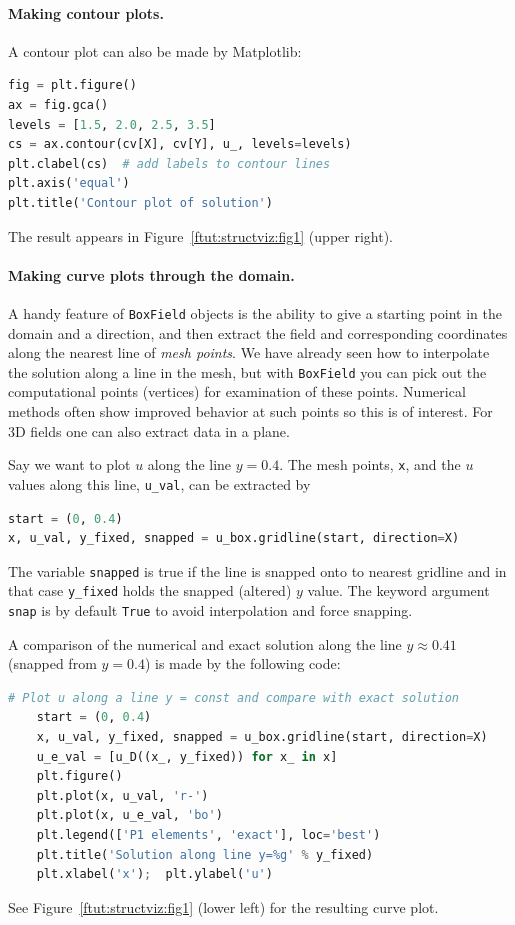 \documentclass[graybox,envcountchap,sectrefs,final]{svmonodo}
\begin{document}

\paragraph{Making contour plots.}
A contour plot can also be made by Matplotlib:

\begin{lstlisting}[language=Python,style=graycolor]
fig = plt.figure()
ax = fig.gca()
levels = [1.5, 2.0, 2.5, 3.5]
cs = ax.contour(cv[X], cv[Y], u_, levels=levels)
plt.clabel(cs)  # add labels to contour lines
plt.axis('equal')
plt.title('Contour plot of solution')
\end{lstlisting}
The result appears in Figure~\ref{ftut:structviz:fig1} (upper right).


\paragraph{Making curve plots through the domain.}
A handy feature of \texttt{BoxField} objects is the ability to give a starting
point in the domain and a direction, and then extract the field and
corresponding coordinates along the nearest line of \emph{mesh points}. We have
already seen how to interpolate the solution along a line in the mesh, but
with \texttt{BoxField} you can pick out the computational points (vertices) for
examination of these points. Numerical methods often show improved behavior
at such points so this is of interest. For 3D fields
one can also extract data in a plane.

Say we want to plot $u$ along
the line $y=0.4$. The mesh points, \texttt{x}, and the $u$ values
along this line, \Verb!u_val!, can be extracted by

\begin{lstlisting}[language=Python,style=graycolor]
start = (0, 0.4)
x, u_val, y_fixed, snapped = u_box.gridline(start, direction=X)
\end{lstlisting}
The variable \texttt{snapped} is true if the line is snapped onto to nearest
gridline and in that case \Verb!y_fixed! holds the snapped
(altered) $y$ value. The keyword argument \texttt{snap} is by default \texttt{True}
to avoid interpolation and force snapping.

A comparison of the numerical and exact solution along the line
$y\approx 0.41$ (snapped from $y=0.4$) is made by the following code:

\begin{lstlisting}[language=Python,style=graycolor]
    # Plot u along a line y = const and compare with exact solution
    start = (0, 0.4)
    x, u_val, y_fixed, snapped = u_box.gridline(start, direction=X)
    u_e_val = [u_D((x_, y_fixed)) for x_ in x]
    plt.figure()
    plt.plot(x, u_val, 'r-')
    plt.plot(x, u_e_val, 'bo')
    plt.legend(['P1 elements', 'exact'], loc='best')
    plt.title('Solution along line y=%g' % y_fixed)
    plt.xlabel('x');  plt.ylabel('u')
\end{lstlisting}
See Figure~\ref{ftut:structviz:fig1} (lower left) for the resulting curve plot.
\end{document}
